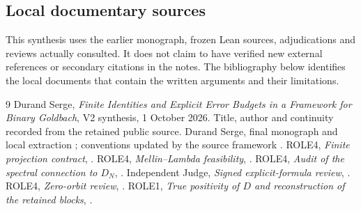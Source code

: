 \documentclass[11pt,a4paper]{article}
\theoremstyle{remark}
\begin{document}
\subsection*{Local documentary sources}
This synthesis uses the earlier monograph, frozen Lean sources,
adjudications and reviews actually consulted. It does not claim
to have verified new external references or secondary citations
in the notes. The bibliography below identifies the local documents that
contain the written arguments and their limitations.
\begin{thebibliography}{9}\small
{} Durand Serge, \emph{Finite Identities and Explicit Error Budgets
in a Framework for Binary Goldbach}, V2 synthesis, 1 October 2026.
Title, author and continuity recorded from the retained public source.
 Durand Serge, final monograph and local extraction
; conventions updated by the source framework
.
 ROLE4, \emph{Finite projection contract},
.
 ROLE4, \emph{Mellin--Lambda feasibility},
.
 ROLE4, \emph{Audit of the spectral connection to $D_N$},
.
 Independent Judge, \emph{Signed explicit-formula review},
.
 ROLE4, \emph{Zero-orbit review},
.
 ROLE1, \emph{True positivity of $D$ and reconstruction
of the retained blocks},
.
\end{thebibliography}
\end{document}
